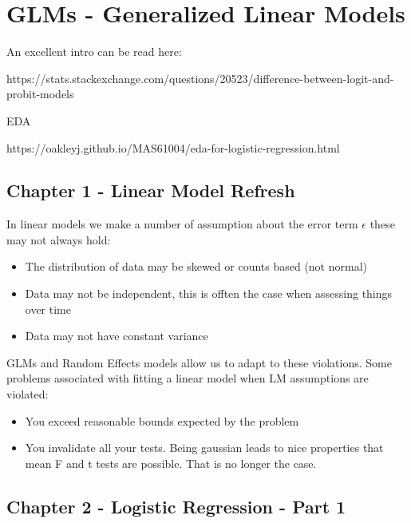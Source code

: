 \documentclass[
  letterpaper,
  DIV=11,
  numbers=noendperiod]{scrreprt}
\providecommand{\tightlist}{%
  \setlength{\itemsep}{0pt}\setlength{\parskip}{0pt}}\usepackage{longtable,booktabs,array}
\begin{document}

\hypertarget{glms---generalized-linear-models}{%
\chapter{GLMs - Generalized Linear
Models}\label{glms---generalized-linear-models}}

An excellent intro can be read here:

https://stats.stackexchange.com/questions/20523/difference-between-logit-and-probit-models

EDA

https://oakleyj.github.io/MAS61004/eda-for-logistic-regression.html

\hypertarget{chapter-1---linear-model-refresh}{%
\section{Chapter 1 - Linear Model
Refresh}\label{chapter-1---linear-model-refresh}}

In linear models we make a number of assumption about the error term
\(\epsilon\) these may not always hold:

\begin{itemize}
\tightlist
\item
  The distribution of data may be skewed or counts based (not normal)
\item
  Data may not be independent, this is offten the case when assessing
  things over time
\item
  Data may not have constant variance
\end{itemize}

GLMs and Random Effects models allow us to adapt to these violations.
Some problems associated with fitting a linear model when LM assumptions
are violated:

\begin{itemize}
\tightlist
\item
  You exceed reasonable bounds expected by the problem
\item
  You invalidate all your tests. Being gaussian leads to nice properties
  that mean F and t tests are possible. That is no longer the case.
\end{itemize}

\hypertarget{chapter-2---logistic-regression---part-1}{%
\section{Chapter 2 - Logistic Regression - Part
1}\label{chapter-2---logistic-regression---part-1}}
\end{document}
